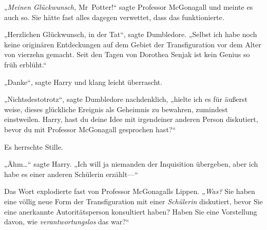 „\emph{Meinen Glückwunsch,} Mr~Potter!“ sagte Professor McGonagall und meinte es auch so. Sie hätte fast alles dagegen verwettet, dass das funktionierte.

„Herzlichen Glückwunsch, in der Tat“, sagte Dumbledore. „Selbst ich habe noch keine originären Entdeckungen auf dem Gebiet der Transfiguration vor dem Alter von vierzehn gemacht. Seit den Tagen von Dorothea Senjak ist kein Genius so früh erblüht.“%

„Danke“, sagte Harry und klang leicht überrascht.

„Nichtsdestotrotz“, sagte Dumbledore nachdenklich, „hielte ich es für äußerst weise, dieses glückliche Ereignis als Geheimnis zu bewahren, zumindest einstweilen. Harry, hast du deine Idee mit irgendeiner anderen Person diskutiert, bevor du mit Professor McGonagall gesprochen hast?“

Es herrschte Stille.

„Ähm…“ sagte Harry. „Ich will ja niemanden der Inquisition übergeben, aber ich habe es einer anderen Schülerin erzählt—“

Das Wort explodierte fast von Professor McGonagalls Lippen. „\emph{Was?} Sie haben eine völlig neue Form der Transfiguration mit einer \emph{Schülerin} diskutiert, bevor Sie eine anerkannte Autoritätsperson konsultiert haben? Haben Sie eine Vorstellung davon, wie \emph{verantwortungslos} das war?“

